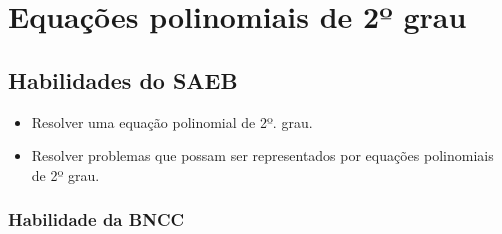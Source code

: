 
















\chapter{Equações polinomiais de 2º grau}

\section{Habilidades do SAEB} 


\begin{itemize}
\item
  Resolver uma equação polinomial de 2º. grau.
\item
  Resolver problemas que possam ser representados por equações
  polinomiais de 2º grau.
\end{itemize}

\subsection{Habilidade da BNCC}


